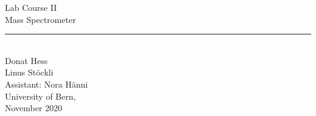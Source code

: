 \begin{center}
    \vspace*{\fill} %
    \LARGE{Lab Course II} \\
    \vspace{5mm}
    \Huge{Mass Spectrometer} \\
    \rule{10cm}{1pt} \\
    \vspace{2cm}
    \Large{Donat Hess \\ Linus Stöckli} \\
    \vspace{1cm}
    \Large{Assistant: Nora Hänni} \\
    \vspace{1cm}
    \Large{University of Bern, \\ November 2020}
    \vspace*{\fill} %
\end{center}
